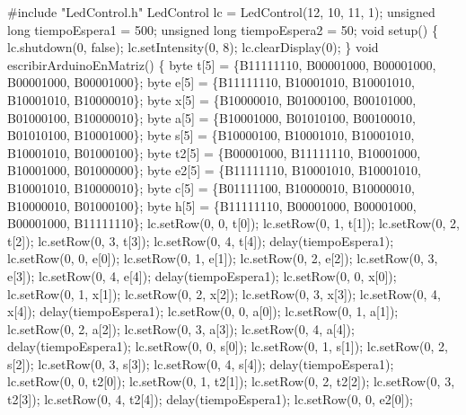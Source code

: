 \documentclass[
]{article}
\newenvironment{Shaded}{}{}
\newcommand{\NormalTok}[1]{#1}
\begin{document}
\begin{Shaded}
\begin{Highlighting}[]
\NormalTok{\#include "LedControl.h"}
\NormalTok{LedControl lc = LedControl(12, 10, 11, 1);}
\NormalTok{unsigned long tiempoEspera1 = 500;}
\NormalTok{unsigned long tiempoEspera2 = 50;}
\NormalTok{void setup() \{}
\NormalTok{  lc.shutdown(0, false);}
\NormalTok{  lc.setIntensity(0, 8);}
\NormalTok{  lc.clearDisplay(0);}
\NormalTok{\}}
\NormalTok{void escribirArduinoEnMatriz() \{}
\NormalTok{  byte t[5] = \{B11111110, B00001000, B00001000, B00001000, B00001000\};}
\NormalTok{  byte e[5] = \{B11111110, B10001010, B10001010, B10001010, B10000010\};}
\NormalTok{  byte x[5] = \{B10000010, B01000100, B00101000, B01000100, B10000010\};}
\NormalTok{  byte a[5] = \{B10001000, B01010100, B00100010, B01010100, B10001000\};}
\NormalTok{  byte s[5] = \{B10000100, B10001010, B10001010, B10001010, B01000100\};}
\NormalTok{  byte t2[5] = \{B00001000, B11111110, B10001000, B10001000, B01000000\};}
\NormalTok{  byte e2[5] = \{B11111110, B10001010, B10001010, B10001010, B10000010\};}
\NormalTok{  byte c[5] = \{B01111100, B10000010, B10000010, B10000010, B01000100\};}
\NormalTok{  byte h[5] = \{B11111110, B00001000, B00001000, B00001000, B11111110\};}
\NormalTok{  lc.setRow(0, 0, t[0]);}
\NormalTok{  lc.setRow(0, 1, t[1]);}
\NormalTok{  lc.setRow(0, 2, t[2]);}
\NormalTok{  lc.setRow(0, 3, t[3]);}
\NormalTok{  lc.setRow(0, 4, t[4]);}
\NormalTok{  delay(tiempoEspera1);}
\NormalTok{  lc.setRow(0, 0, e[0]);}
\NormalTok{  lc.setRow(0, 1, e[1]);}
\NormalTok{  lc.setRow(0, 2, e[2]);}
\NormalTok{  lc.setRow(0, 3, e[3]);}
\NormalTok{  lc.setRow(0, 4, e[4]);}
\NormalTok{  delay(tiempoEspera1);}
\NormalTok{  lc.setRow(0, 0, x[0]);}
\NormalTok{  lc.setRow(0, 1, x[1]);}
\NormalTok{  lc.setRow(0, 2, x[2]);}
\NormalTok{  lc.setRow(0, 3, x[3]);}
\NormalTok{  lc.setRow(0, 4, x[4]);}
\NormalTok{  delay(tiempoEspera1);}
\NormalTok{  lc.setRow(0, 0, a[0]);}
\NormalTok{  lc.setRow(0, 1, a[1]);}
\NormalTok{  lc.setRow(0, 2, a[2]);}
\NormalTok{  lc.setRow(0, 3, a[3]);}
\NormalTok{  lc.setRow(0, 4, a[4]);}
\NormalTok{  delay(tiempoEspera1);}
\NormalTok{  lc.setRow(0, 0, s[0]);}
\NormalTok{  lc.setRow(0, 1, s[1]);}
\NormalTok{  lc.setRow(0, 2, s[2]);}
\NormalTok{  lc.setRow(0, 3, s[3]);}
\NormalTok{  lc.setRow(0, 4, s[4]);}
\NormalTok{  delay(tiempoEspera1);}
\NormalTok{  lc.setRow(0, 0, t2[0]);}
\NormalTok{  lc.setRow(0, 1, t2[1]);}
\NormalTok{  lc.setRow(0, 2, t2[2]);}
\NormalTok{  lc.setRow(0, 3, t2[3]);}
\NormalTok{  lc.setRow(0, 4, t2[4]);}
\NormalTok{  delay(tiempoEspera1);}
\NormalTok{  lc.setRow(0, 0, e2[0]);}

\end{Highlighting}
\end{Shaded}
\end{document}
